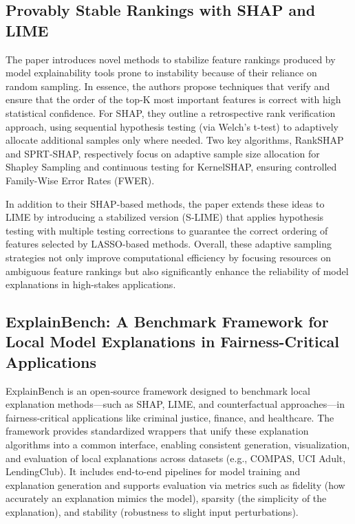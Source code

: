 \documentclass{article}
\begin{document}
\subsection{Provably Stable Rankings with SHAP and LIME}
The paper introduces novel methods to stabilize feature rankings produced by model explainability tools prone to instability because of their reliance on random sampling. In essence, the authors propose techniques that verify and ensure that the order of the top‑K most important features is correct with high statistical confidence. For SHAP, they outline a retrospective rank verification approach, using sequential hypothesis testing (via Welch’s t-test) to adaptively allocate additional samples only where needed. Two key algorithms, RankSHAP and SPRT‑SHAP, respectively focus on adaptive sample size allocation for Shapley Sampling and continuous testing for KernelSHAP, ensuring controlled Family-Wise Error Rates (FWER).

In addition to their SHAP-based methods, the paper extends these ideas to LIME by introducing a stabilized version (S‑LIME) that applies hypothesis testing with multiple testing corrections to guarantee the correct ordering of features selected by LASSO-based methods. Overall, these adaptive sampling strategies not only improve computational efficiency by focusing resources on ambiguous feature rankings but also significantly enhance the reliability of model explanations in high-stakes applications.

\subsection{ExplainBench: A Benchmark Framework for Local Model
Explanations in Fairness-Critical Applications}
ExplainBench is an open‐source framework designed to benchmark local explanation methods—such as SHAP, LIME, and counterfactual approaches—in fairness-critical applications like criminal justice, finance, and healthcare. The framework provides standardized wrappers that unify these explanation algorithms into a common interface, enabling consistent generation, visualization, and evaluation of local explanations across datasets (e.g., COMPAS, UCI Adult, LendingClub). It includes end-to-end pipelines for model training and explanation generation and supports evaluation via metrics such as fidelity (how accurately an explanation mimics the model), sparsity (the simplicity of the explanation), and stability (robustness to slight input perturbations).
\end{document}

